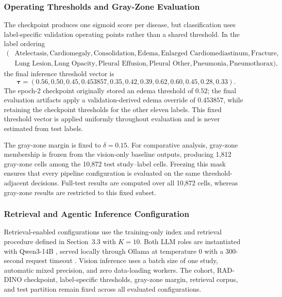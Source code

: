 \subsubsection{Operating Thresholds and Gray-Zone Evaluation}

The checkpoint produces one sigmoid score per disease, but classification uses label-specific validation operating points rather than a shared threshold. In the label ordering
\[
\begin{split}
(&\text{Atelectasis},\text{Cardiomegaly},\text{Consolidation},\text{Edema},
\text{Enlarged Cardiomediastinum},\text{Fracture},\\
&\text{Lung Lesion},\text{Lung Opacity},\text{Pleural Effusion},
\text{Pleural Other},\text{Pneumonia},\text{Pneumothorax}),
\end{split}
\]
the final inference threshold vector is
\[
\boldsymbol{\tau}=
(0.56,0.50,0.45,0.453857,0.35,0.42,0.39,0.62,0.60,0.45,0.28,0.33).
\]
The epoch-2 checkpoint originally stored an edema threshold of $0.52$; the final evaluation artifacts apply a validation-derived edema override of $0.453857$, while retaining the checkpoint thresholds for the other eleven labels. This fixed threshold vector is applied uniformly throughout evaluation and is never estimated from test labels.

The gray-zone margin is fixed to $\delta=0.15$. For comparative analysis, gray-zone membership is frozen from the vision-only baseline outputs, producing 1,812 gray-zone cells among the 10,872 test study--label cells. Freezing this mask ensures that every pipeline configuration is evaluated on the same threshold-adjacent decisions. Full-test results are computed over all 10,872 cells, whereas gray-zone results are restricted to this fixed subset.

\subsubsection{Retrieval and Agentic Inference Configuration}

Retrieval-enabled configurations use the training-only index and retrieval procedure defined in Section~3.3 with $K=10$. Both LLM roles are instantiated with Qwen3-14B \cite{yang2025qwen3}, served locally through Ollama at temperature $0$ with a 300-second request timeout \cite{ollama2024structured}. Vision inference uses a batch size of one study, automatic mixed precision, and zero data-loading workers. The cohort, RAD-DINO checkpoint, label-specific thresholds, gray-zone margin, retrieval corpus, and test partition remain fixed across all evaluated configurations.

